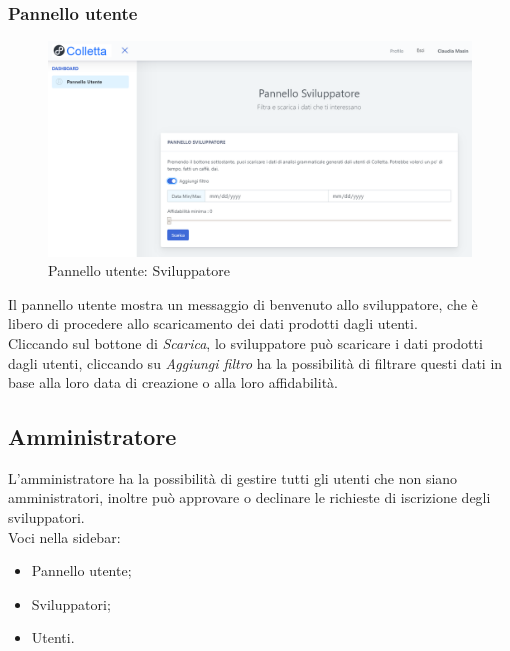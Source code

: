     	\subsubsection{Pannello utente}
    				\begin{figure}[H]
				\centering
				\includegraphics[width=17cm]{sez/img/sviluppatore/panelloutente.PNG}
				\caption{Pannello utente: Sviluppatore}\label{fig:1}
			\end{figure}
    	  Il pannello utente mostra un messaggio di benvenuto allo sviluppatore, che è libero di procedere allo scaricamento dei dati prodotti dagli utenti.
    	   \\Cliccando sul bottone di \textit{Scarica}, lo sviluppatore può scaricare i dati prodotti dagli utenti, cliccando su \textit{Aggiungi filtro} ha la possibilità di filtrare questi dati in base alla loro data di creazione o alla loro affidabilità. 

	\newpage
	\subsection{Amministratore}
	L'amministratore ha la possibilità di gestire tutti gli utenti che non siano amministratori, inoltre può approvare o declinare le richieste di iscrizione degli sviluppatori.
		  \\Voci nella sidebar:
			\begin{itemize}
				\item Pannello utente;
				\item Sviluppatori;
				\item Utenti.
			\end{itemize}



